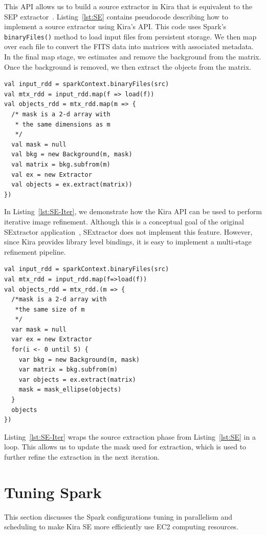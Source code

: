 \documentclass[conference]{IEEEtran}
\begin{document}
This API allows us to build a source extractor in Kira that is equivalent to the SEP
extractor~\cite{barbary2015}.
Listing~\ref{lst:SE} contains pseudocode describing how to implement a source extractor
using Kira's API. This code uses Spark's \texttt{binaryFiles()} method to load input
files from persistent storage. We then map over each file to convert the FITS data into
matrices with associated metadata. In the final map stage, we estimates and remove the
background from the matrix. Once the background is removed, we then extract the objects
from the matrix.

\begin{lstlisting}[caption=Objects Extraction Logic, label=lst:SE, linewidth=0.5\textwidth, xleftmargin=2.5ex]
val input_rdd = sparkContext.binaryFiles(src)
val mtx_rdd = input_rdd.map(f => load(f))
val objects_rdd = mtx_rdd.map(m => {
  /* mask is a 2-d array with 
   * the same dimensions as m
   */
  val mask = null
  val bkg = new Background(m, mask)
  val matrix = bkg.subfrom(m)
  val ex = new Extractor
  val objects = ex.extract(matrix))
})
\end{lstlisting}

In Listing~\ref{lst:SE-Iter}, we demonstrate how the Kira API can be used to perform
iterative image refinement. Although this is a conceptual goal of the original SExtractor
application~\cite{bertin96}, SExtractor does not implement this feature. However, since Kira provides
library level bindings, it is easy to implement a multi-stage refinement pipeline.

\begin{lstlisting}[caption=Iterative Objects Extraction Logic, label=lst:SE-Iter, linewidth=0.5\textwidth, xleftmargin=2.5ex]
val input_rdd = sparkContext.binaryFiles(src)
val mtx_rdd = input_rdd.map(f=>load(f))
val objects_rdd = mtx_rdd.(m => {
  /*mask is a 2-d array with 
   *the same size of m
   */
  var mask = null
  var ex = new Extractor   
  for(i <- 0 until 5) {
    var bkg = new Background(m, mask)
    var matrix = bkg.subfrom(m) 
    var objects = ex.extract(matrix)
    mask = mask_ellipse(objects)  
  }
  objects
})
\end{lstlisting}

Listing~\ref{lst:SE-Iter} wraps the source extraction phase from Listing~\ref{lst:SE} in a loop. 
This allows us to update the mask used for extraction, which is used to further refine the extraction
 in the next iteration.


\section{Tuning Spark}
This section discusses the Spark configurations tuning in parallelism and scheduling to make
Kira SE more efficiently use EC2 computing resources. 
\end{document}
